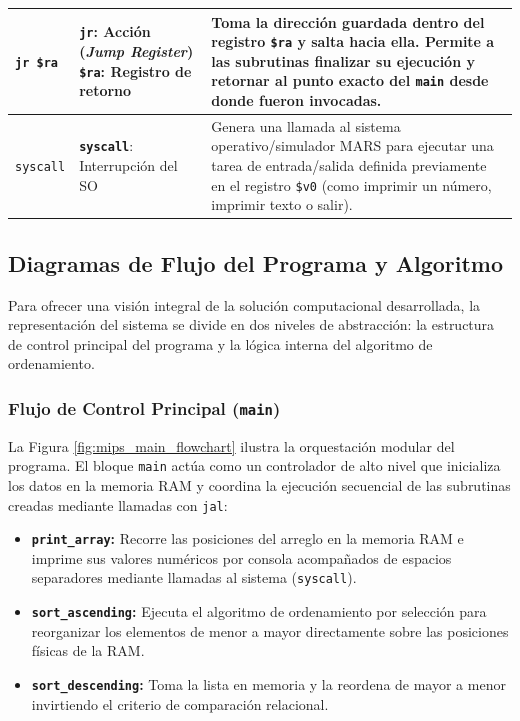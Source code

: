 \documentclass[12pt,a4paper]{article}
\begin{document}
\begin{longtable}{@{} L{2.8cm} L{4.5cm} L{8.3cm}}
\midrule
\texttt{jr \$ra} & 
\textbf{\texttt{jr}}: Acción (\textit{Jump Register})\newline
\textbf{\texttt{\$ra}}: Registro de retorno & 
Toma la dirección guardada dentro del registro \texttt{\$ra} y salta hacia ella. Permite a las subrutinas finalizar su ejecución y retornar al punto exacto del \texttt{main} desde donde fueron invocadas. \\
\midrule
\texttt{syscall} & 
\textbf{\texttt{syscall}}: Interrupción del SO & 
Genera una llamada al sistema operativo/simulador MARS para ejecutar una tarea de entrada/salida definida previamente en el registro \texttt{\$v0} (como imprimir un número, imprimir texto o salir). \\
\end{longtable}
\subsection{Diagramas de Flujo del Programa y Algoritmo}

Para ofrecer una visión integral de la solución computacional desarrollada, la representación del sistema se divide en dos niveles de abstracción: la estructura de control principal del programa y la lógica interna del algoritmo de ordenamiento.

\subsubsection{Flujo de Control Principal (\texttt{main})}
La Figura \ref{fig:mips_main_flowchart} ilustra la orquestación modular del programa. El bloque \texttt{main} actúa como un controlador de alto nivel que inicializa los datos en la memoria RAM y coordina la ejecución secuencial de las subrutinas creadas mediante llamadas con \texttt{jal}:

\begin{itemize}[leftmargin=*]
    \item \textbf{\texttt{print\_array}:} Recorre las posiciones del arreglo en la memoria RAM e imprime sus valores numéricos por consola acompañados de espacios separadores mediante llamadas al sistema (\texttt{syscall}).
    \item \textbf{\texttt{sort\_ascending}:} Ejecuta el algoritmo de ordenamiento por selección para reorganizar los elementos de menor a mayor directamente sobre las posiciones físicas de la RAM.
    \item \textbf{\texttt{sort\_descending}:} Toma la lista en memoria y la reordena de mayor a menor invirtiendo el criterio de comparación relacional.
\end{itemize}
\end{document}
